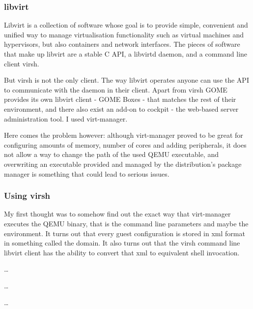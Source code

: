 \subsubsection{libvirt}


Libvirt is a collection of software whose goal is to provide simple, convenient
and unified way to manage virtualisation functionality such as virtual machines
and hypervisors, but also containers and network interfaces.  The pieces of
software that make up libvirt are a stable C API, a libvirtd daemon, and
a command line client virsh.

But virsh is not the only client.  The way libvirt operates anyone can use the
API to communicate with the daemon in their client.  Apart from virsh GOME
provides its own libvirt client - GOME Boxes - that matches the rest of their
environment, and there also exist an add-on to cockpit - the web-based server
administration tool.  I used virt-manager.

Here comes the problem however: although virt-manager proved to be great for
configuring amounts of memory, number of cores and adding peripherals, it does
not allow a way to change the path of the used QEMU executable, and overwriting
an executable provided and managed by the distribution's package manager is
something that could lead to serious issues.

\subsubsection{Using virsh}


My first thought was to somehow find out the exact way that virt-manager
executes the QEMU binary, that is the command line parameters and maybe the
environment.  It turns out that every guest configuration is stored in xml
format in something called the domain.  It also turns out that the virsh command
line libvirt client has the ability to convert that xml to equivalent shell
invocation.

\begin{codeblock}
    \dots
    
    \dots
    
    \dots
    
\end{codeblock}

